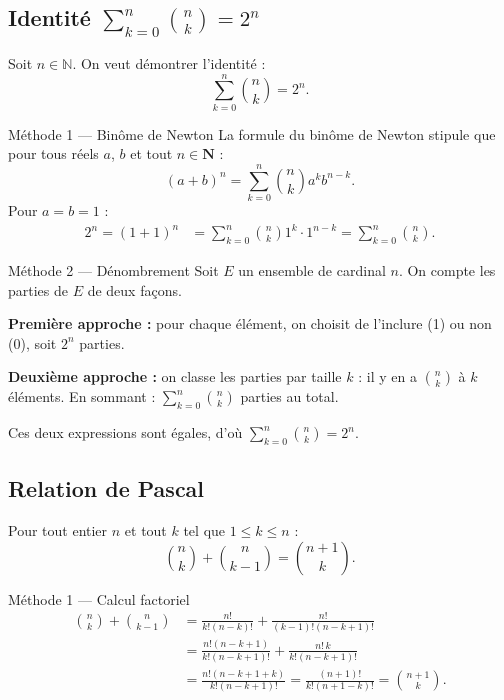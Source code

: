 \documentclass[11pt,a4paper,openany]{book}
\theoremstyle{definition}
\begin{document}
    \subsection{Identité $\sum_{k=0}^{n} \binom{n}{k} = 2^n$}

    \begin{enoncebox}
    Soit $n \in \mathbb{N}$. On veut démontrer l'identité :
    \[\sum_{k=0}^{n} \binom{n}{k} = 2^n.\]
    \end{enoncebox}

    \begin{methodebox}{Méthode 1 — Binôme de Newton}
    La formule du binôme de Newton stipule que pour tous réels $a$, $b$ et tout $n\in\mathbf{N}$ :
    \[(a + b)^n = \sum_{k=0}^{n} \binom{n}{k} a^k b^{n-k}.\]
    Pour $a = b = 1$ :
    \begin{align*}
    2^n = (1+1)^n &= \sum_{k=0}^{n} \binom{n}{k} 1^k \cdot 1^{n-k} = \sum_{k=0}^{n} \binom{n}{k}.
    \end{align*}
    \end{methodebox}

    \begin{methodebox}{Méthode 2 — Dénombrement}
    Soit $E$ un ensemble de cardinal $n$. On compte les parties de $E$ de deux façons.

    \textbf{Première approche :} pour chaque élément, on choisit de l'inclure (1) ou non (0), soit $2^n$ parties.

    \textbf{Deuxième approche :} on classe les parties par taille $k$ : il y en a $\binom{n}{k}$ à $k$ éléments. En sommant :
    $\displaystyle\sum_{k=0}^{n}\binom{n}{k}$ parties au total.

    Ces deux expressions sont égales, d'où $\displaystyle\sum_{k=0}^{n}\binom{n}{k}=2^n$.
    \end{methodebox}

    \subsection{Relation de Pascal}

    \begin{enoncebox}
    Pour tout entier $n$ et tout $k$ tel que $1\leq k\leq n$ :
    \[\binom{n}{k}+\binom{n}{k-1}=\binom{n+1}{k}.\]
    \end{enoncebox}

    \begin{methodebox}{Méthode 1 — Calcul factoriel}
    \begin{align*}
    \binom{n}{k}+\binom{n}{k-1}
    &=\frac{n!}{k!(n-k)!}+\frac{n!}{(k-1)!(n-k+1)!}\\
    &=\frac{n!(n-k+1)}{k!(n-k+1)!}+\frac{n!\,k}{k!(n-k+1)!}\\
    &=\frac{n!(n-k+1+k)}{k!(n-k+1)!}
    =\frac{(n+1)!}{k!(n+1-k)!}=\binom{n+1}{k}.
    \end{align*}
    \end{methodebox}
\end{document}
